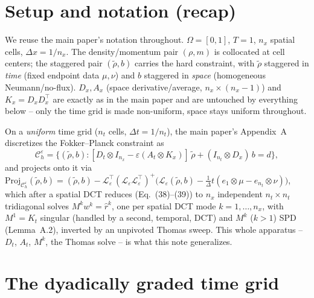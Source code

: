 \documentclass[11pt]{article}
\newcommand{\eps}{\varepsilon}
\newcommand{\dt}{\Delta t}
\newcommand{\dx}{\Delta x}
\newcommand{\Ch}{\mathcal{C}^\eps_h}
\begin{document}
\section{Setup and notation (recap)}

We reuse the main paper's notation throughout. $\Omega=[0,1]$, $T=1$, $n_x$ spatial cells,
$\dx = 1/n_x$. The density/momentum pair $(\rho,m)$ is collocated at cell centers; the
staggered pair $(\tilde\rho, b)$ carries the hard constraint, with $\tilde\rho$ staggered in
\emph{time} (fixed endpoint data $\mu,\nu$) and $b$ staggered in \emph{space} (homogeneous
Neumann/no-flux). $D_x, A_x$ (space derivative/average, $n_x\times(n_x{-}1)$) and $K_x = D_xD_x^\top$
are exactly as in the main paper and are untouched by everything below -- only the time grid is
made non-uniform, space stays uniform throughout.

On a \emph{uniform} time grid ($n_t$ cells, $\dt=1/n_t$), the main paper's Appendix~A discretizes
the Fokker--Planck constraint as
\begin{equation}
  \label{eq:uniform-set}
  \Ch = \bigl\{(\tilde\rho,b) : [D_t\otimes I_{n_x} - \eps(A_t\otimes K_x)]\,\tilde\rho +
        (I_{n_t}\otimes D_x)\,b = d \bigr\},
\end{equation}
and projects onto it via $\mathrm{Proj}_{\Ch}(\tilde\rho,b) = (\tilde\rho,b) - \mathcal{L}_\eps^\top
(\mathcal{L}_\eps\mathcal{L}_\eps^\top)^+\bigl(\mathcal{L}_\eps(\tilde\rho,b)-\tfrac1\dt(e_1{\otimes}\mu-e_{n_t}{\otimes}\nu)\bigr)$,
which after a spatial DCT reduces (Eq.~(38)--(39)) to $n_x$ independent $n_t\times n_t$
tridiagonal solves $M^k w^k = \hat r^k$, one per spatial DCT mode $k=1,\dots,n_x$, with $M^1=K_t$
singular (handled by a second, temporal, DCT) and $M^k$ ($k>1$) SPD (Lemma~A.2), inverted by an
unpivoted Thomas sweep. This whole apparatus -- $D_t$, $A_t$, $M^k$, the Thomas solve -- is what
this note generalizes.

\section{The dyadically graded time grid}
\label{sec:dyadic-grid}
\end{document}
